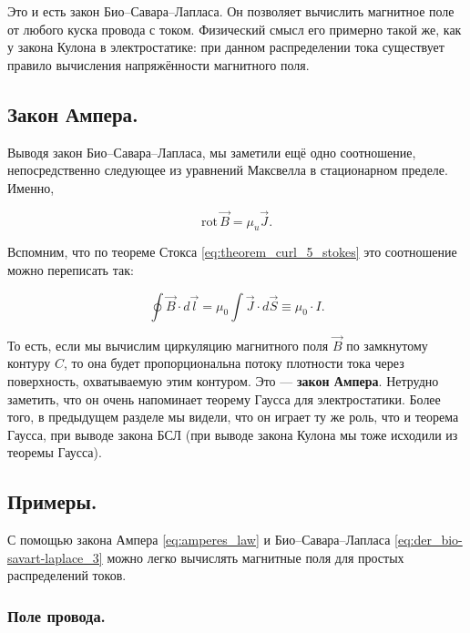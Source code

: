 \documentclass[11pt,a4paper]{article}
\numberwithin{equation}{section}
\newcommand{\rot}{\mathrm{rot}\,}
\begin{document}
Это и есть закон Био--Савара--Лапласа. Он позволяет вычислить
магнитное поле от любого куска провода с током. Физический смысл его
примерно такой же, как у закона Кулона в электростатике: при данном
распределении тока существует правило вычисления напряжённости
магнитного поля. 

\subsection{Закон Ампера.}
\label{sec:amperes_law}

Выводя закон Био--Савара--Лапласа, мы заметили ещё одно соотношение,
непосредственно следующее из уравнений Максвелла в стационарном
пределе. Именно, 

\begin{equation}
  \label{eq:der_amperes_law}
  \rot \vec{B} = \mu_u \vec{J}.
\end{equation}

Вспомним, что по теореме Стокса \eqref{eq:theorem_curl_5_stokes} это
соотношение можно переписать так: 

\begin{equation}
  \label{eq:amperes_law}
  \oint \vec{B} \cdot d \vec{l} = \mu_0 \int \vec{J} \cdot d\vec{S} \equiv
  \mu_0 \cdot I.
\end{equation}

То есть, если мы вычислим циркуляцию магнитного поля $\vec{B}$ по
замкнутому контуру $C$, то она будет пропорциональна потоку плотности
тока через поверхность, охватываемую этим контуром. Это ---
\textbf{закон Ампера}. Нетрудно заметить, что он очень напоминает
теорему Гаусса для электростатики. Более того, в предыдущем разделе мы
видели, что он играет ту же роль, что и теорема Гаусса, при выводе
закона БСЛ (при выводе закона Кулона мы тоже исходили из теоремы
Гаусса). 

\subsection{Примеры.}
\label{sec:magnetostatics_examples}

С помощью закона Ампера \eqref{eq:amperes_law} и Био--Савара--Лапласа
\eqref{eq:der_bio-savart-laplace_3} можно легко вычислять магнитные
поля для простых распределений токов. 

\subsubsection{Поле провода. }
\label{sec:mfield_wire}
\end{document}
